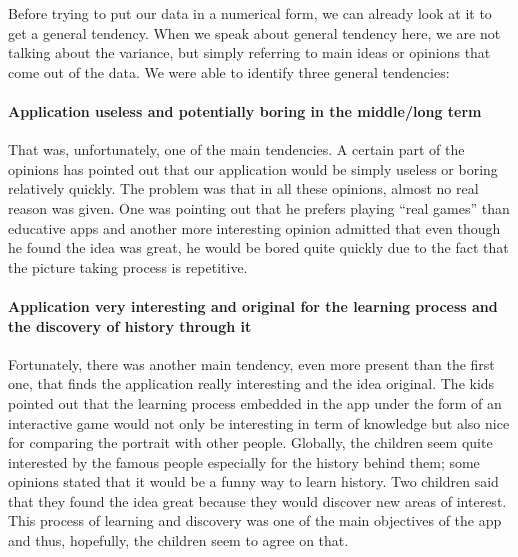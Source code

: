 \documentclass[12pt]{scrartcl}
\begin{document}
			Before trying to put our data in a numerical form, we can already look at it to get a general tendency. When we speak about general tendency here, we are not talking about the variance, but simply referring to main ideas or opinions that come out of the data. We were able to identify three general tendencies:

				\paragraph{Application useless and potentially boring in the middle/long term} 
					That was, unfortunately, one of the main tendencies. A certain part of the opinions has pointed out that our application would be simply useless or boring relatively quickly. The problem was that in all these opinions, almost no real reason was given. One was pointing out that he prefers playing ``real games'' than educative apps and another more interesting opinion admitted that even though he found the idea was great, he would be bored quite quickly due to the fact that the picture taking process is repetitive.

				\paragraph{Application very interesting and original for the learning process and the discovery of history through it}
					Fortunately, there was another main tendency, even more present than the first one, that finds the application really interesting and the idea original. The kids pointed out that the learning process embedded in the app under the form of an interactive game would not only be interesting in term of knowledge but also nice for comparing the portrait with other people. Globally, the children seem quite interested by the famous people especially for the history behind them; some opinions stated that it would be a funny way to learn history. Two children said that they found the idea great because they would discover new areas of interest. This process of learning and discovery was one of the main objectives of the app and thus, hopefully, the children seem to agree on that. 
\end{document}

